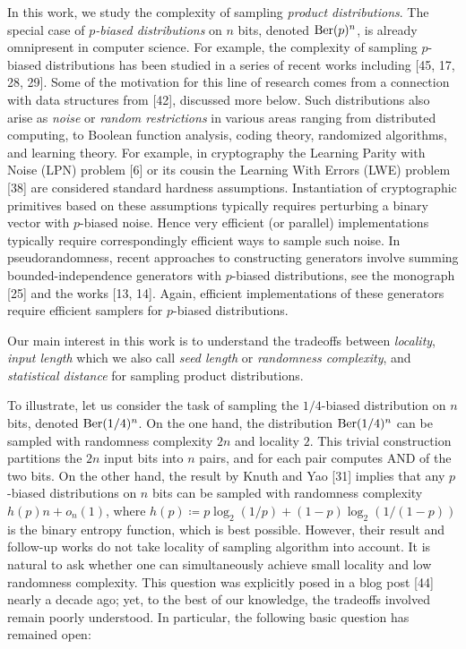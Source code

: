 In this work, we study the complexity of sampling \emph{product distributions}. The special case of \emph{$p$-biased distributions} on $n$ bits, denoted $\textnormal{Ber}(p)^{n}$, is already omnipresent in computer science. For example, the complexity of sampling $p$-biased distributions has been studied in a series of recent works including [45, 17, 28, 29]. Some of the motivation for this line of research comes from a connection with data structures from [42], discussed more below. Such distributions also arise as \emph{noise} or \emph{random restrictions} in various areas ranging from distributed computing, to Boolean function analysis, coding theory, randomized algorithms, and learning theory. For example, in cryptography
the Learning Parity with Noise (LPN) problem [6] or its cousin the Learning With Errors (LWE) problem [38] are considered standard hardness assumptions. Instantiation of cryptographic primitives based on these assumptions typically requires perturbing a binary vector with $p$-biased noise. Hence very efficient (or parallel) implementations typically require correspondingly efficient ways to sample such noise.
In pseudorandomness, recent approaches to constructing generators involve summing bounded-independence generators with $p$-biased distributions, see the monograph [25] and the works [13, 14]. Again, efficient implementations of these generators require efficient samplers for $p$-biased distributions.\par




Our main interest in this work is to understand the tradeoffs between \emph{locality}, \emph{input length} which we also call \emph{seed length} or \emph{randomness complexity}, and \emph{statistical distance} for sampling product distributions.\par




To illustrate, let us consider the task of sampling the $1/4$-biased distribution on $n$ bits, denoted $\textnormal{Ber}(1/4)^{n}$.
On the one hand, the distribution $\textnormal{Ber}(1/4)^{n}$ can be sampled with randomness complexity $2n$ and locality $2$. This trivial construction partitions the $2n$ input bits into $n$ pairs, and for each pair computes AND of the two bits.
On the other hand, the result by Knuth and Yao [31] implies that any $p$-biased distributions on $n$ bits can be sampled with randomness complexity $h(p)n+o_{n}(1)$, where $h(p)\coloneq p\log_{2}(1/p)+(1-p)\log_{2}(1/(1-p))$ is the binary entropy function, which is best possible.
However, their result and follow-up works do not take locality of sampling algorithm into account.
It is natural to ask whether one can simultaneously achieve small locality and low randomness complexity. This question was explicitly posed in a blog post [44] nearly a decade ago; yet, to the best of our knowledge, the tradeoffs involved remain poorly understood. In particular, the following basic question has remained open:\par





